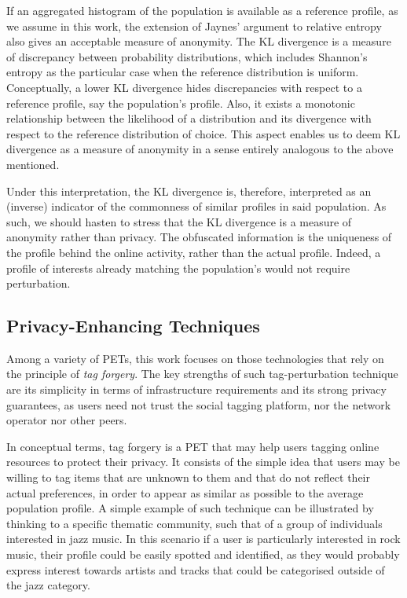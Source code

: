 If an aggregated histogram of the population is available as a reference profile, as we assume in this work, the extension of Jaynes' argument to relative entropy also gives an acceptable measure of anonymity.
The KL divergence is a measure of discrepancy between probability distributions, which includes Shannon's entropy as the particular case when the reference distribution is uniform.
Conceptually, a lower KL divergence hides discrepancies with respect to a reference profile, say the population's profile. Also, it exists a monotonic relationship between the likelihood of a distribution and its divergence with respect to the reference distribution of choice. This aspect enables us to deem KL divergence as a measure of anonymity in a sense entirely analogous to the above mentioned.

Under this interpretation, the KL divergence is, therefore, interpreted as an (inverse) indicator of the commonness of similar profiles in said population. As such, we should hasten to stress that the KL divergence is a measure of anonymity rather than privacy. The obfuscated information is the uniqueness of the profile behind the online activity, rather than the actual profile. Indeed, a profile of interests already matching the population's would not require perturbation.

\subsection{Privacy-Enhancing Techniques}
\label{sec:pets}
Among a variety of PETs, this work focuses on those technologies that rely on the principle of \emph{tag forgery}. The key strengths of such tag-perturbation technique are its simplicity in terms of infrastructure requirements and its strong privacy guarantees, as users need not trust the social tagging platform, nor the network operator nor other peers.

In conceptual terms, tag forgery is a PET that may help users tagging online resources to protect their privacy. It consists of the simple idea that users may be willing to tag items that are unknown to them and that do not reflect their actual preferences, in order to appear as similar as possible to the average population profile. A simple example of such technique can be illustrated by thinking to a specific thematic community, such that of a group of individuals interested in jazz music. In this scenario if a user is particularly interested in rock music, their profile could be easily spotted and identified, as they would probably express interest towards artists and tracks that could be categorised outside of the jazz category.

